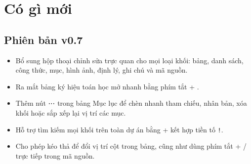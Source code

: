 \section{Có gì mới}

\subsection*{Phiên bản v0.7}
\begin{itemize}
  \item Bổ sung hộp thoại chỉnh sửa trực quan cho mọi loại khối: bảng, danh
    sách, công thức, mục, hình ảnh, định lý, ghi chú và mã nguồn.
  \item Ra mắt bảng ký hiệu toán học mở nhanh bằng phím tắt
    + .
  \item Thêm nút ⋯ trong bảng Mục lục để chèn nhanh tham chiếu, nhân bản, xóa
    khối hoặc sắp xếp lại vị trí các mục.
  \item Hỗ trợ tìm kiếm mọi khối trên toàn dự án bằng + kết
    hợp tiền tố \texttt{!}.
  \item Cho phép kéo thả để đổi vị trí cột trong bảng, cũng như dùng phím tắt
    + /  trực tiếp trong mã nguồn.
\end{itemize}